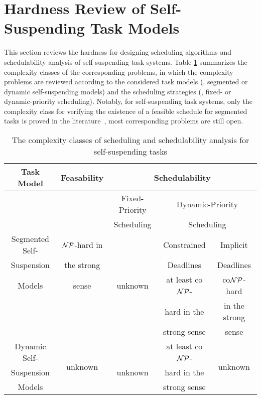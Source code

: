 \section{Hardness Review of Self-Suspending Task Models}
\label{sec:hardness}
This section reviews the hardness for designing scheduling algorithms and schedulability analysis of self-suspending task systems. Table \ref{table:complexity} summarizes the complexity classes of the corresponding problems, in which the complexity problems are reviewed according to the considered task models (\ie, segmented or dynamic self-suspending models) and the scheduling strategies (\ie, fixed- or dynamic-priority scheduling). Notably, for self-suspending task systems, only the complexity class for verifying the existence of a feasible schedule for segmented tasks is proved in the literature~\cite{Ric03,Ridouard_2004}, most corresponding problems are still open.

\begin{table}
\centering
    \begin{tabular}{|c|c|c|c|c|}
 \hline
        Task Model & Feasability & \multicolumn{3}{c|}{Schedulability} \\
        \hline
        &  & Fixed-Priority & \multicolumn{2}{c|}{Dynamic-Priority}\\
        &  & Scheduling     & \multicolumn{2}{c|}{Scheduling}\\
        \cline{3-5}    
        Segmented Self- & ${\cal NP}$-hard in &  & Constrained & Implicit\\
        Suspension  & the strong &   & Deadlines   & Deadlines \\
        \cline{4-5}
        Models & sense \cite{Ridouard_2004} & unknown & at least co${\cal NP}$- & co${\cal NP}$-hard \\
        &  & & hard in the & in the strong\\
        & & & strong sense & sense\\
        \hline
        Dynamic Self- & \multirow{3}{*}{unknown} & & at least co${\cal NP}$- & \multirow{3}{*}{unknown}\\
        Suspension & & unknown &hard in the & \\
        Models & & & strong sense & \\
        \hline
    \end{tabular}
    \caption{The complexity classes of scheduling and schedulability analysis for self-suspending tasks}
    \label{table:complexity}
\end{table}

